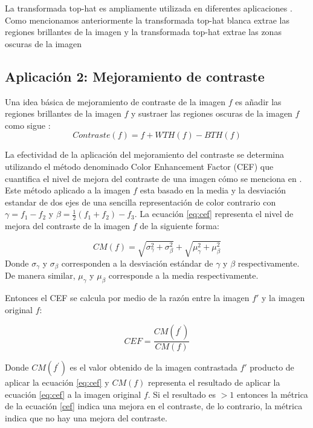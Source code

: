 La transformada top-hat es ampliamente utilizada en diferentes aplicaciones \cite{soille2013morphological,mukhopadhyay2000multiscale,soille1997note,bai2010analysis,bai2010infrared,bai2010analysis1}. Como mencionamos anteriormente la transformada top-hat blanca extrae las regiones brillantes de la imagen y la transformada top-hat extrae las zonas oscuras de la imagen

\subsection{Aplicación 2: Mejoramiento de contraste}
 Una idea b\'asica de mejoramiento de contraste  de la imagen $f$ es a\~nadir las regiones brillantes de la imagen $f$ y sustraer las regiones oscuras de la imagen $f$ como sigue \cite{soille2013morphological}:
\begin{equation}
\label{contraste}
Contraste(f) = f + WTH(f) - BTH(f) 
\end{equation}


La efectividad de la aplicación del mejoramiento del contraste se determina utilizando el método denominado Color Enhancement Factor (CEF) que cuantifica el nivel de mejora del contraste de una imagen cómo se menciona en \cite{susstrunk2003color}. Este método aplicado a la imagen $f$ esta basado en la media y la desviación estandar de dos ejes de una sencilla representación de color contrario con $\gamma = f_1 - f_2$ y $\beta = \frac{1}{2}(f_1 + f_2) - f_3$.
La ecuación \ref{eq:cef} representa el nivel de mejora del contraste de la imagen $f$ de la siguiente forma:

\begin{equation}
CM(f)=\sqrt{\sigma_{\gamma}^{2} + \sigma_{\beta}^{2}} + \sqrt{\mu_{\gamma}^{2} + \mu_{\beta}^{2}}
\label{eq:cef}
\end{equation} Donde $\sigma_{\gamma}$ y $\sigma_{\beta}$ corresponden a la desviación estándar  de $\gamma$ y $\beta$ respectivamente. De manera similar, $\mu_{\gamma}$ y $\mu_{\beta}$ corresponde a la media respectivamente.

Entonces el CEF se calcula por medio de la razón entre la imagen $f'$ y la imagen original $f$:

\begin{equation}
CEF = \frac{CM(f^{'})}{CM(f)}
\label{cef}
\end{equation}

Donde $CM(f^{'})$ es el valor obtenido de la imagen contrastada $f'$ producto de aplicar la ecuación \ref{eq:cef} y $CM(f)$ representa el resultado de aplicar la ecuación \ref{eq:cef} a la imagen original $f$. Si el resultado es $> 1$ entonces la métrica de la ecuación \ref{cef} indica una mejora en el contraste, de lo contrario, la métrica indica que no hay una mejora del contraste.



